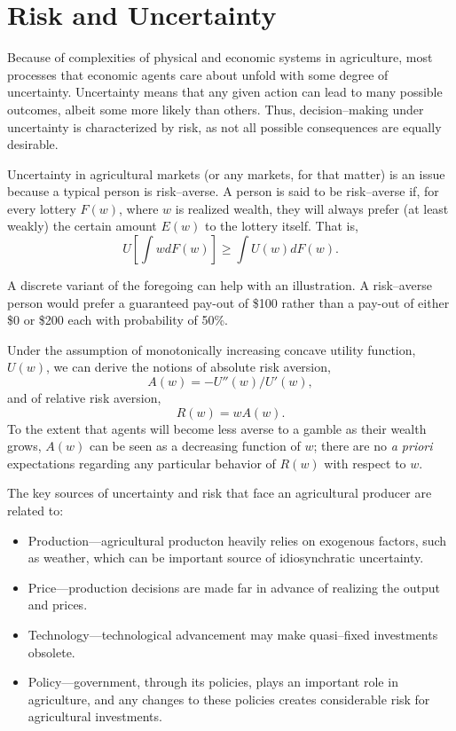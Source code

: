\documentclass[]{book}
\providecommand{\tightlist}{%
  \setlength{\itemsep}{0pt}\setlength{\parskip}{0pt}}
\begin{document}
\chapter{Risk and Uncertainty}\label{risk-and-uncertainty}

Because of complexities of physical and economic systems in agriculture,
most processes that economic agents care about unfold with some degree
of uncertainty. Uncertainty means that any given action can lead to many
possible outcomes, albeit some more likely than others. Thus,
decision--making under uncertainty is characterized by risk, as not all
possible consequences are equally desirable.

Uncertainty in agricultural markets (or any markets, for that matter) is
an issue because a typical person is risk--averse. A person is said to
be risk--averse if, for every lottery \(F(w)\), where \(w\) is realized
wealth, they will always prefer (at least weakly) the certain amount
\(E(w)\) to the lottery itself. That is,
\[U\left[\int w dF(w)\right] \ge \int U(w)dF(w).\]

A discrete variant of the foregoing can help with an illustration. A
risk--averse person would prefer a guaranteed pay-out of \$100 rather
than a pay-out of either \$0 or \$200 each with probability of 50\%.

Under the assumption of monotonically increasing concave utility
function, \(U(w)\), we can derive the notions of absolute risk aversion,
\[A(w) = -U''(w)/U'(w),\] and of relative risk aversion,
\[R(w) = wA(w).\] To the extent that agents will become less averse to a
gamble as their wealth grows, \(A(w)\) can be seen as a decreasing
function of \(w\); there are no \emph{a priori} expectations regarding
any particular behavior of \(R(w)\) with respect to \(w\).

The key sources of uncertainty and risk that face an agricultural
producer are related to:

\begin{itemize}
\tightlist
\item
  Production---agricultural producton heavily relies on exogenous
  factors, such as weather, which can be important source of
  idiosynchratic uncertainty.
\item
  Price---production decisions are made far in advance of realizing the
  output and prices.
\item
  Technology---technological advancement may make quasi--fixed
  investments obsolete.
\item
  Policy---government, through its policies, plays an important role in
  agriculture, and any changes to these policies creates considerable
  risk for agricultural investments.
\end{itemize}
\end{document}
